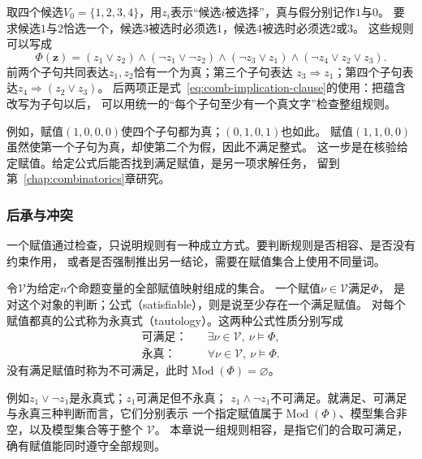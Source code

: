 取四个候选$V_0=\{1,2,3,4\}$，用$z_i$表示“候选$i$被选择”，真与假分别记作$1$与$0$。
要求候选$1$与$2$恰选一个，候选$3$被选时必须选$1$，候选$4$被选时必须选$2$或$3$。
这些规则可以写成
\begin{equation}
  \Phi(\bm{z})
  =
  (z_1\lor z_2)
  \land(\neg z_1\lor\neg z_2)
  \land(\neg z_3\lor z_1)
  \land(\neg z_4\lor z_2\lor z_3).
  \label{eq:comb-running-cnf}
\end{equation}
前两个子句共同表达$z_1,z_2$恰有一个为真；第三个子句表达
$z_3\Rightarrow z_1$；第四个子句表达$z_4\Rightarrow(z_2\lor z_3)$。
后两项正是式~\eqref{eq:comb-implication-clause}的使用：把蕴含改写为子句以后，
可以用统一的“每个子句至少有一个真文字”检查整组规则。

例如，赋值$(1,0,0,0)$使四个子句都为真；$(0,1,0,1)$也如此。
赋值$(1,1,0,0)$虽然使第一个子句为真，却使第二个为假，因此不满足整式。
这一步是在核验给定赋值。给定公式后能否找到满足赋值，是另一项求解任务，
留到第~\ref{chap:combinatorics}章研究。

\subsubsection{后承与冲突}
\label{sec:prelim-entailment-conflicts}

一个赋值通过检查，只说明规则有一种成立方式。要判断规则是否相容、是否没有约束作用，
或者是否强制推出另一结论，需要在赋值集合上使用不同量词。

\begin{definition}[满足、可满足与永真]
\label{def:comb-satisfiability}
令$\mathcal{V}$为给定$n$个命题变量的全部赋值映射组成的集合。
一个赋值$\nu\in\mathcal{V}$满足$\Phi$，
是对这个对象的判断；公式（satisfiable），则是说至少存在一个满足赋值。
对每个赋值都真的公式称为永真式（tautology）。这两种公式性质分别写成
\[
  \begin{aligned}
    \text{可满足：}&\quad \exists\nu\in\mathcal{V},\ \nu\models\Phi,\\
    \text{永真：}&\quad \forall\nu\in\mathcal{V},\ \nu\models\Phi.
  \end{aligned}
\]
没有满足赋值时称为不可满足，此时$\operatorname{Mod}(\Phi)=\varnothing$。
\end{definition}

例如$z_1\lor\neg z_1$是永真式；$z_1$可满足但不永真；
$z_1\land\neg z_1$不可满足。就满足、可满足与永真三种判断而言，它们分别表示
一个指定赋值属于$\operatorname{Mod}(\Phi)$、模型集合非空，以及模型集合等于整个
$\mathcal{V}$。
本章说一组规则相容，是指它们的合取可满足，确有赋值能同时遵守全部规则。

